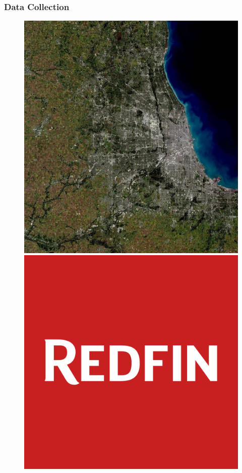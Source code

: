 \documentclass{beamer}
\begin{document}
\begin{frame}
\frametitle{Data Collection}


\begin{figure}[h]
  \centering
  \begin{minipage}[t]{0.3\textwidth}
    \centering
    \includegraphics[width=\textwidth]{Visual/landsat.jpeg}
  \end{minipage}\hfill
  \begin{minipage}[t]{0.3\textwidth}
    \centering
    \includegraphics[width=\textwidth]{Visual/redfin-logo-square-red-1200.png}

\end{minipage}
\end{figure}
\end{frame}
\end{document}
